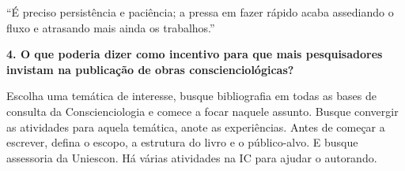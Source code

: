 \documentclass{gescons}
\begin{document}
\begin{multicols}{2}
\begin{pullquote}
    ``É preciso persistência e paciência; a pressa em fazer rápido acaba assediando o fluxo e atrasando mais ainda os trabalhos.''
\end{pullquote}

\textbf{4.       O que poderia dizer como incentivo para que mais pesquisadores invistam na publicação de obras conscienciológicas?}

Escolha uma temática de interesse, busque bibliografia em todas as bases de consulta da Conscienciologia e comece a focar naquele assunto. Busque convergir as atividades para aquela temática, anote as experiências. Antes de começar a escrever, defina o escopo, a estrutura do livro e o público-alvo. E busque assessoria da Uniescon. Há várias atividades na IC para ajudar o autorando. 
    
    
    \end{multicols}
\end{document}
